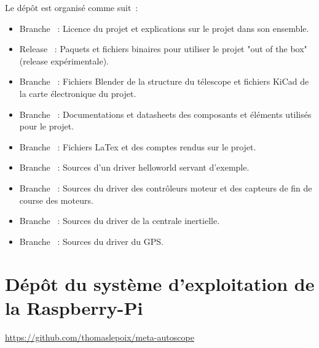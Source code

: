 Le dépôt est organisé comme suit~:
\begin{itemize}[label=$\bullet$]
	\item Branche {\href{https://github.com/thibaudledo/Autoscope/tree/master}{}}~: Licence du projet et explications sur le projet dans son ensemble.
	\item Release {\href{https://github.com/thibaudledo/Autoscope/releases}{}}~: Paquets et fichiers binaires pour utiliser le projet "out of the box" (release expérimentale).
	\item Branche {\href{https://github.com/thibaudledo/Autoscope/tree/hardware}{}}~: Fichiers Blender de la structure du télescope et fichiers KiCad de la carte électronique du projet.
	\item Branche {\href{https://github.com/thibaudledo/Autoscope/tree/doc}{}}~: Documentations et datasheets des composants et éléments utilisés pour le projet.
	\item Branche {\href{https://github.com/thibaudledo/Autoscope/tree/latex}{}}~: Fichiers LaTex et  des comptes rendus sur le projet.
	\item Branche {\href{https://github.com/thibaudledo/Autoscope/tree/hello_mod}{}}~: Sources d'un driver helloworld servant d'exemple.
	\item Branche {\href{https://github.com/thibaudledo/Autoscope/tree/a4988_mod}{}}~: Sources du driver des contrôleurs moteur et des capteurs de fin de course des moteurs.
	\item Branche {\href{https://github.com/thibaudledo/Autoscope/tree/mpu_9250_mod}{}}~: Sources du driver de la centrale inertielle.
	\item Branche {\href{https://github.com/thibaudledo/Autoscope/tree/mtk3339_mod}{}}~: Sources du driver du GPS.
	\end{itemize}

\newpage
\section{Dépôt du système d'exploitation de la Raspberry-Pi}

\url{https://github.com/thomaslepoix/meta-autoscope}

\vspace{1cm}


